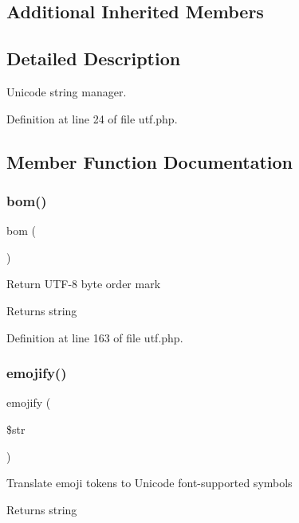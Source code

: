 \subsection*{Additional Inherited Members}


\subsection{Detailed Description}
Unicode string manager. 

Definition at line 24 of file utf.\+php.



\subsection{Member Function Documentation}
\hypertarget{class_u_t_f_a5cb12f35229a81f7a869171b000573b8}{}\label{class_u_t_f_a5cb12f35229a81f7a869171b000573b8} 
\subsubsection{\texorpdfstring{bom()}{bom()}}
{\footnotesize\ttfamily bom (\begin{DoxyParamCaption}{ }\end{DoxyParamCaption})}

Return U\+T\+F-\/8 byte order mark \begin{DoxyReturn}{Returns}
string 
\end{DoxyReturn}


Definition at line 163 of file utf.\+php.

\hypertarget{class_u_t_f_aaf95120818560ee5ba86d5f4efba6671}{}\label{class_u_t_f_aaf95120818560ee5ba86d5f4efba6671} 
\subsubsection{\texorpdfstring{emojify()}{emojify()}}
{\footnotesize\ttfamily emojify (\begin{DoxyParamCaption}\item[{}]{\$str }\end{DoxyParamCaption})}

Translate emoji tokens to Unicode font-\/supported symbols \begin{DoxyReturn}{Returns}
string 
\end{DoxyReturn}


